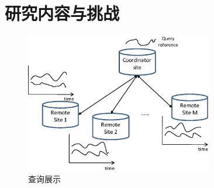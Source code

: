   		                                                                                              

\section{研究内容与挑战}\label{sec-c1-content}
\begin{figure}
	\centering
	\includegraphics[width=0.73\textwidth]{Fig/chapter1/coor-remote}
	\caption{查询展示}
	\label{fig-chapter1-demonstrate}
\end{figure}

